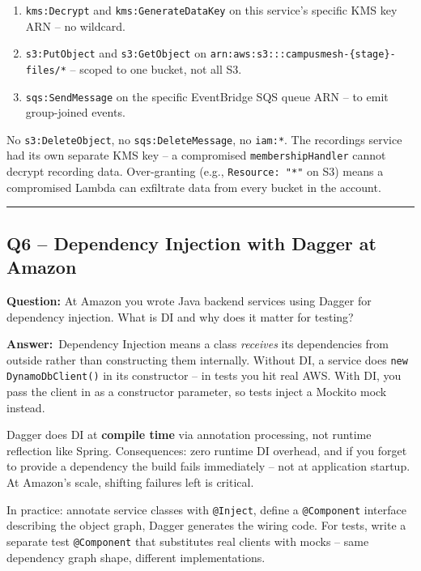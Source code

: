 \documentclass[letterpaper,10pt]{article}
\newlength{\boxwidth}
\newcommand{\questionbox}[1]{%
  \vspace{6pt}%
  \noindent\colorbox{qbg}{%
    \begin{minipage}{\boxwidth}%
      \vspace{3pt}\textbf{\textcolor{nordblue}{Question:}} #1\vspace{3pt}%
    \end{minipage}%
  }\vspace{2pt}%
}
\newcommand{\answerlabel}{\noindent\textbf{\textcolor{answerblue}{Answer:}}~}
\begin{document}
\begin{enumerate}[leftmargin=*, itemsep=0pt]
  \item \texttt{kms:Decrypt} and \texttt{kms:GenerateDataKey} on this service's specific KMS key ARN -- no wildcard.
  \item \texttt{s3:PutObject} and \texttt{s3:GetObject} on \texttt{arn:aws:s3:::campusmesh-\{stage\}-files/*} -- scoped to one bucket, not all S3.
  \item \texttt{sqs:SendMessage} on the specific EventBridge SQS queue ARN -- to emit group-joined events.
\end{enumerate}

No \texttt{s3:DeleteObject}, no \texttt{sqs:DeleteMessage}, no \texttt{iam:*}. The recordings service had its own separate KMS key -- a compromised \texttt{membershipHandler} cannot decrypt recording data. Over-granting (e.g., \texttt{Resource: "*"} on S3) means a compromised Lambda can exfiltrate data from every bucket in the account.

\medskip\rule{\linewidth}{0.2pt}

\subsection*{Q6 -- Dependency Injection with Dagger at Amazon}

\questionbox{At Amazon you wrote Java backend services using Dagger for dependency injection. What is DI and why does it matter for testing?}

\answerlabel Dependency Injection means a class \textit{receives} its dependencies from outside rather than constructing them internally. Without DI, a service does \texttt{new DynamoDbClient()} in its constructor -- in tests you hit real AWS. With DI, you pass the client in as a constructor parameter, so tests inject a Mockito mock instead.

Dagger does DI at \textbf{compile time} via annotation processing, not runtime reflection like Spring. Consequences: zero runtime DI overhead, and if you forget to provide a dependency the build fails immediately -- not at application startup. At Amazon's scale, shifting failures left is critical.

In practice: annotate service classes with \texttt{@Inject}, define a \texttt{@Component} interface describing the object graph, Dagger generates the wiring code. For tests, write a separate test \texttt{@Component} that substitutes real clients with mocks -- same dependency graph shape, different implementations.
\end{document}
